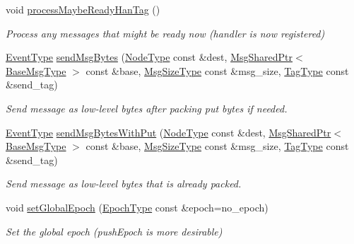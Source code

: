 \begin{DoxyCompactItemize}
void \hyperlink{structvt_1_1messaging_1_1_active_messenger_ac9fcc6ef325258985074c699b0d783c6}{process\+Maybe\+Ready\+Han\+Tag} ()
\begin{DoxyCompactList}\small\item\em Process any messages that might be ready now (handler is now registered) \end{DoxyCompactList}\item 
\hyperlink{namespacevt_a009267401def7ae8bf201892222d060f}{Event\+Type} \hyperlink{structvt_1_1messaging_1_1_active_messenger_ab3542048b6c0f380899643b031eb1731}{send\+Msg\+Bytes} (\hyperlink{namespacevt_a866da9d0efc19c0a1ce79e9e492f47e2}{Node\+Type} const \&dest, \hyperlink{structvt_1_1messaging_1_1_msg_shared_ptr}{Msg\+Shared\+Ptr}$<$ \hyperlink{namespacevt_a44d0d4e144748f2b19a1cfd962f50338}{Base\+Msg\+Type} $>$ const \&base, \hyperlink{namespacevt_abfa009d900299ac1df967b40ea8f2c8a}{Msg\+Size\+Type} const \&msg\+\_\+size, \hyperlink{namespacevt_a84ab281dae04a52a4b243d6bf62d0e52}{Tag\+Type} const \&send\+\_\+tag)
\begin{DoxyCompactList}\small\item\em Send message as low-\/level bytes after packing put bytes if needed. \end{DoxyCompactList}\item 
\hyperlink{namespacevt_a009267401def7ae8bf201892222d060f}{Event\+Type} \hyperlink{structvt_1_1messaging_1_1_active_messenger_a46c03a8a4da878972eda8db2d3f1cc1d}{send\+Msg\+Bytes\+With\+Put} (\hyperlink{namespacevt_a866da9d0efc19c0a1ce79e9e492f47e2}{Node\+Type} const \&dest, \hyperlink{structvt_1_1messaging_1_1_msg_shared_ptr}{Msg\+Shared\+Ptr}$<$ \hyperlink{namespacevt_a44d0d4e144748f2b19a1cfd962f50338}{Base\+Msg\+Type} $>$ const \&base, \hyperlink{namespacevt_abfa009d900299ac1df967b40ea8f2c8a}{Msg\+Size\+Type} const \&msg\+\_\+size, \hyperlink{namespacevt_a84ab281dae04a52a4b243d6bf62d0e52}{Tag\+Type} const \&send\+\_\+tag)
\begin{DoxyCompactList}\small\item\em Send message as low-\/level bytes that is already packed. \end{DoxyCompactList}\item 
void \hyperlink{structvt_1_1messaging_1_1_active_messenger_aa17a3e718783d3aa08cd61d81abeb6a5}{set\+Global\+Epoch} (\hyperlink{namespacevt_a985a5adf291c34a3ca263b3378388236}{Epoch\+Type} const \&epoch=no\+\_\+epoch)
\begin{DoxyCompactList}\small\item\em Set the global epoch ({\ttfamily push\+Epoch} is more desirable) \end{DoxyCompactList}\item 

\end{DoxyCompactItemize}
